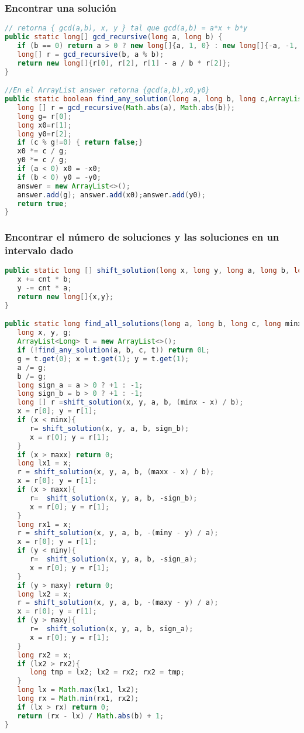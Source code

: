 \subsubsection{Encontrar una solución}
\begin{lstlisting}[language=Java]
// retorna { gcd(a,b), x, y } tal que gcd(a,b) = a*x + b*y
public static long[] gcd_recursive(long a, long b) {
   if (b == 0) return a > 0 ? new long[]{a, 1, 0} : new long[]{-a, -1, 0};
   long[] r = gcd_recursive(b, a % b);
   return new long[]{r[0], r[2], r[1] - a / b * r[2]};
}

//En el ArrayList answer retorna {gcd(a,b),x0,y0}
public static boolean find_any_solution(long a, long b, long c,ArrayList<Long> answer) {
   long [] r = gcd_recursive(Math.abs(a), Math.abs(b));
   long g= r[0];
   long x0=r[1];
   long y0=r[2];
   if (c % g!=0) { return false;}
   x0 *= c / g;
   y0 *= c / g;
   if (a < 0) x0 = -x0;
   if (b < 0) y0 = -y0;
   answer = new ArrayList<>();
   answer.add(g); answer.add(x0);answer.add(y0);
   return true;
}
\end{lstlisting}


\subsubsection{Encontrar el número de soluciones y las soluciones en un intervalo dado}
\begin{lstlisting}[language=Java]
public static long [] shift_solution(long x, long y, long a, long b, long cnt) {
   x += cnt * b;
   y -= cnt * a;
   return new long[]{x,y};
}

public static long find_all_solutions(long a, long b, long c, long minx, long maxx, long miny, long maxy) {
   long x, y, g;
   ArrayList<Long> t = new ArrayList<>();
   if (!find_any_solution(a, b, c, t)) return 0L;
   g = t.get(0); x = t.get(1); y = t.get(1);
   a /= g;
   b /= g;
   long sign_a = a > 0 ? +1 : -1;
   long sign_b = b > 0 ? +1 : -1;
   long [] r =shift_solution(x, y, a, b, (minx - x) / b);
   x = r[0]; y = r[1];
   if (x < minx){
      r= shift_solution(x, y, a, b, sign_b);
      x = r[0]; y = r[1];
   }
   if (x > maxx) return 0;
   long lx1 = x;
   r = shift_solution(x, y, a, b, (maxx - x) / b);
   x = r[0]; y = r[1];
   if (x > maxx){
      r=  shift_solution(x, y, a, b, -sign_b);
      x = r[0]; y = r[1];
   }
   long rx1 = x;
   r = shift_solution(x, y, a, b, -(miny - y) / a);
   x = r[0]; y = r[1];
   if (y < miny){
      r=  shift_solution(x, y, a, b, -sign_a);
      x = r[0]; y = r[1];
   }
   if (y > maxy) return 0;
   long lx2 = x;
   r = shift_solution(x, y, a, b, -(maxy - y) / a);
   x = r[0]; y = r[1];
   if (y > maxy){
      r=  shift_solution(x, y, a, b, sign_a);
      x = r[0]; y = r[1];
   }
   long rx2 = x;
   if (lx2 > rx2){
      long tmp = lx2; lx2 = rx2; rx2 = tmp;
   }
   long lx = Math.max(lx1, lx2);
   long rx = Math.min(rx1, rx2);
   if (lx > rx) return 0;
   return (rx - lx) / Math.abs(b) + 1;
}
\end{lstlisting}
